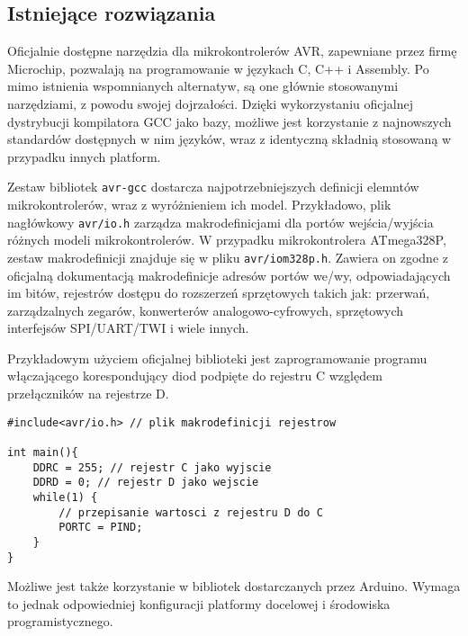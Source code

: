 \subsection{Istniejące rozwiązania}
Oficjalnie dostępne narzędzia dla mikrokontrolerów AVR, zapewniane przez firmę Microchip, pozwalają na programowanie w językach C, C++ i Assembly. Po mimo istnienia wspomnianych alternatyw, są one głównie stosowanymi narzędziami, z powodu swojej dojrzałości.
Dzięki wykorzystaniu oficjalnej dystrybucji kompilatora GCC jako bazy, możliwe jest korzystanie z najnowszych standardów dostępnych w nim języków, wraz z identyczną składnią stosowaną w przypadku innych platform.

Zestaw bibliotek \lstinline|avr-gcc| dostarcza najpotrzebniejszych definicji elemntów mikrokontrolerów, wraz z wyróżnieniem ich model. Przykładowo, plik nagłówkowy \lstinline|avr/io.h| zarządza makrodefinicjami dla portów wejścia/wyjścia różnych modeli mikrokontrolerów. W przypadku mikrokontrolera ATmega328P, zestaw makrodefinicji znajduje się w pliku \lstinline|avr/iom328p.h|. Zawiera on zgodne z oficjalną dokumentacją makrodefinicje adresów portów we/wy, odpowiadających im bitów, rejestrów dostępu do rozszerzeń sprzętowych takich jak: przerwań, zarządzalnych zegarów, konwerterów analogowo-cyfrowych, sprzętowych interfejsów SPI/UART/TWI i wiele innych.

Przykładowym użyciem oficjalnej biblioteki jest zaprogramowanie programu włączającego korespondujący diod podpięte do rejestru C względem przełączników na rejestrze D.
\begin{lstlisting}
#include<avr/io.h> // plik makrodefinicji rejestrow

int main(){
	DDRC = 255; // rejestr C jako wyjscie
	DDRD = 0; // rejestr D jako wejscie
	while(1) {
		// przepisanie wartosci z rejestru D do C
		PORTC = PIND;
	}
}
\end{lstlisting}

Możliwe jest także korzystanie w bibliotek dostarczanych przez Arduino. Wymaga to jednak odpowiedniej konfiguracji platformy docelowej i środowiska programistycznego.

